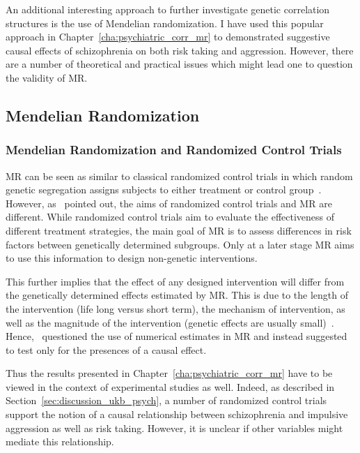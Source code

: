 An additional interesting approach to further investigate genetic correlation structures is the use of Mendelian randomization.
I have used this popular approach in Chapter~\ref{cha:psychiatric_corr_mr} to demonstrated suggestive causal effects of schizophrenia on both risk taking and aggression.
However, there are a number of theoretical and practical issues which might lead one to question the validity of MR\@.

\subsection{Mendelian Randomization}
\label{sub:mendelian_randomization_discussion}

\subsubsection{Mendelian Randomization and Randomized Control Trials}
\label{ssub:causality_and_mendelian_randomization}

MR can be seen as similar to classical randomized control trials in which random genetic segregation  assigns subjects to either treatment or control group~\cite{Hingorani2005}.
However, as~\citet{Burgess2016a} pointed out, the aims of randomized control trials and MR are different.
While randomized control trials aim to evaluate the effectiveness of different treatment strategies, the main goal of MR is to assess differences in risk factors between genetically determined subgroups. 
Only at a later stage MR aims to use this information to design non-genetic interventions.

This further implies that the effect of any designed intervention will differ from the genetically determined effects estimated by MR\@.
This is due to the length of the intervention (life long versus short term), the mechanism of intervention, as well as the magnitude of the intervention (genetic effects are usually small)~\cite{Evans2015}. 
Hence,~\citet{Vanderweele2015} questioned the use of  numerical estimates in MR and instead suggested to test only for the presences of a causal effect.

Thus the results presented in Chapter~\ref{cha:psychiatric_corr_mr} have to be viewed in the context of experimental studies as well.
Indeed, as described in Section~\ref{sec:discussion_ukb_psych}, a number of randomized control trials support the notion of a causal relationship between schizophrenia and impulsive aggression as well as risk taking. 
However, it is unclear if other variables might mediate this relationship.


